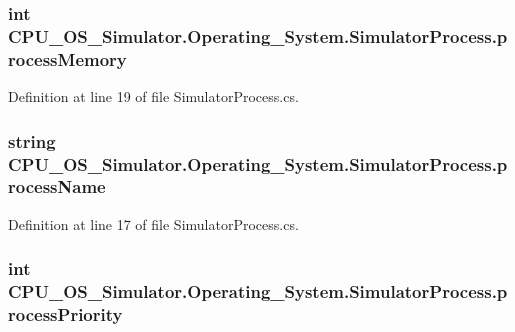 \subsubsection[{process\+Memory}]{\setlength{\rightskip}{0pt plus 5cm}int C\+P\+U\+\_\+\+O\+S\+\_\+\+Simulator.\+Operating\+\_\+\+System.\+Simulator\+Process.\+process\+Memory\hspace{0.3cm}{\ttfamily [private]}}\label{class_c_p_u___o_s___simulator_1_1_operating___system_1_1_simulator_process_af574b021e490c03ed55332ee0ed4c067}


Definition at line 19 of file Simulator\+Process.\+cs.

\hypertarget{class_c_p_u___o_s___simulator_1_1_operating___system_1_1_simulator_process_a6d29b67977f07ebb1b6336b96960752b}{}
\subsubsection[{process\+Name}]{\setlength{\rightskip}{0pt plus 5cm}string C\+P\+U\+\_\+\+O\+S\+\_\+\+Simulator.\+Operating\+\_\+\+System.\+Simulator\+Process.\+process\+Name\hspace{0.3cm}{\ttfamily [private]}}\label{class_c_p_u___o_s___simulator_1_1_operating___system_1_1_simulator_process_a6d29b67977f07ebb1b6336b96960752b}


Definition at line 17 of file Simulator\+Process.\+cs.

\hypertarget{class_c_p_u___o_s___simulator_1_1_operating___system_1_1_simulator_process_a122acf698432625719c9ddd0152aab0d}{}
\subsubsection[{process\+Priority}]{\setlength{\rightskip}{0pt plus 5cm}int C\+P\+U\+\_\+\+O\+S\+\_\+\+Simulator.\+Operating\+\_\+\+System.\+Simulator\+Process.\+process\+Priority\hspace{0.3cm}{\ttfamily [private]}}\label{class_c_p_u___o_s___simulator_1_1_operating___system_1_1_simulator_process_a122acf698432625719c9ddd0152aab0d}


